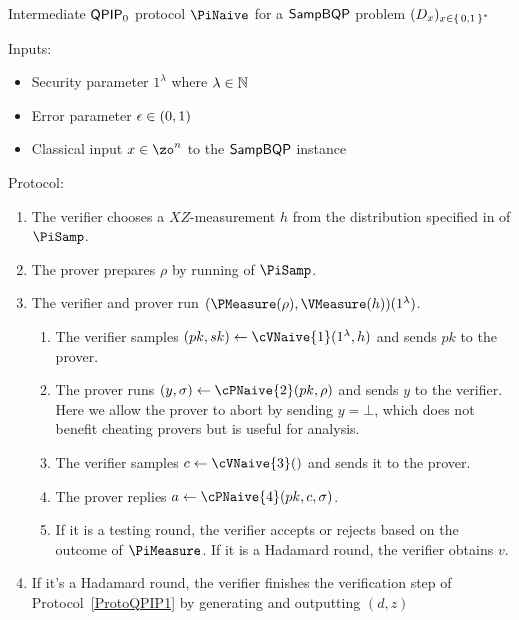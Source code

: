 \begin{protocol}{Intermediate $\operatorname{\mathsf{QPIP}}_0$ protocol $\PiNaive$ for a $\operatorname{\mathsf{SampBQP}}$ problem $(D_x)_{x\in\set{0, 1}^*}$}
	\label{proto:qpip0_naive}

	Inputs:
	\begin{itemize}
		\item Security parameter $1^\lambda$ where $\lambda\in\mathbb{N}$
		\item Error parameter $\epsilon\in(0, 1)$
		\item Classical input $x\in\zo^n$ to the $\operatorname{\mathsf{SampBQP}}$ instance
	\end{itemize}

	Protocol:
	\begin{enumerate}
		\item \label{step:naive1} The verifier chooses a $XZ$-measurement $h$ from the distribution specified in  of $\PiSamp$.
		\item \label{step:naive2} The prover prepares $\rho$ by running  of $\PiSamp$.
		\item \label{step:urmila-in-naive}
		    The verifier and prover run $(\PMeasure(\rho), \VMeasure(h))(1^\lambda)$.
			\begin{enumerate}
				\item The verifier samples $(pk, sk)\leftarrow\cVNaive{1}(1^\lambda, h)$ and sends $pk$ to the prover.
				\item The prover runs $(y, \sigma)\leftarrow\cPNaive{2}(pk, \rho)$ and sends $y$ to the verifier.
	    			Here we allow the prover to abort by sending $y=\bot$, which does not benefit cheating provers but is useful for analysis.
				\item\label{step:c-urmila-in-naive} The verifier samples $c\leftarrow\cVNaive{3}()$  and sends it to the prover.
				\item The prover replies $a\leftarrow\cPNaive{4}(pk, c, \sigma)$.
				\item 
					If it is a testing round, the verifier accepts or rejects based on the outcome of $\PiMeasure$.
					If it is a Hadamard round, the verifier obtains $v$.
			\end{enumerate}
		\item \label{step:naive-output} If it's a Hadamard round, the verifier finishes the verification step of Protocol~\ref{ProtoQPIP1} by generating and outputting $(d, z)$
	\end{enumerate}
\end{protocol}

